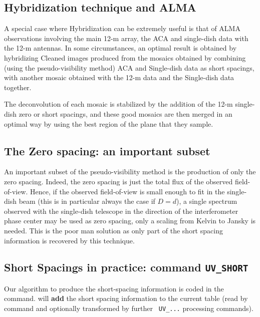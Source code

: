 \subsection{Hybridization technique and ALMA}
A special case where Hybridization can be extremely useful is that
of ALMA observations involving the main 12-m array, the ACA and single-dish
data with the 12-m antennas.  In some circumstances, an optimal
result is obtained by hybridizing Cleaned images produced
from the mosaics obtained by combining (using the pseudo-visibility method)
ACA and Single-dish data
as short spacings, with another mosaic obtained with the 12-m
data and the Single-dish data together.

The deconvolution of each mosaic is stabilized by the addition
of the 12-m single-dish zero or short spacings, and these good
mosaics are then merged in an optimal way by using the best
region of the \uv{} plane that they sample.

\subsection{The Zero spacing: an important subset}

An important subset of the pseudo-visibility method is the production of
only the zero spacing. Indeed, the zero spacing is just the total flux of
the observed field-of-view. Hence, if the observed field-of-view is small
enough to fit in the single-dish beam (this is in particular always the
case if $D = d$), a single spectrum observed with the single-dish telescope
in the direction of the interferometer phase center may be used as zero
spacing, only a scaling from Kelvin to Jansky is needed. This is the poor
man solution as only part of the short spacing information is recovered
by this technique.

\subsection{Short Spacings in practice: command \texttt{UV\_SHORT}}

Our algorithm to produce the short-spacing information is coded in the
 command.   will \textbf{add} the 
short spacing information to the current \uv{} table (read by
command  and optionally transformed by further 
\texttt{\color{magenta} UV\_...} processing commands). 

